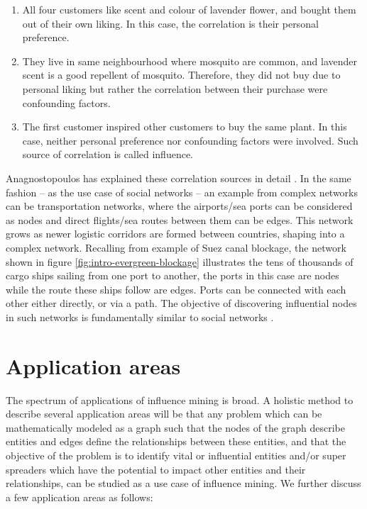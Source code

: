 	\begin{enumerate}
		\item All four customers like scent and colour of lavender flower, and bought them out of their own liking. In this case, the correlation is their personal preference.
		
		\item They live in same neighbourhood where mosquito are common, and lavender scent is a good repellent of mosquito. Therefore, they did not buy due to personal liking but rather the correlation between their purchase were confounding factors.
		
		\item The first customer inspired other customers to buy the same plant. In this case, neither personal preference nor confounding factors were involved. Such source of correlation is called influence.
	\end{enumerate}
	
	Anagnostopoulos has explained these correlation sources in detail \cite{anagnostopoulos2008}. In the same fashion -- as the use case of social networks -- an example from complex networks can be transportation networks, where the airports/sea ports can be considered as nodes and direct flights/sea routes between them can be edges. This network grows as newer logistic corridors are formed between countries, shaping into a complex network. Recalling from example of Suez canal blockage, the network shown in figure \ref{fig:intro-evergreen-blockage} illustrates the tens of thousands of cargo ships sailing from one port to another, the ports in this case are nodes while the route these ships follow are edges. Ports can be connected with each other either directly, or via a path. The objective of discovering influential nodes in such networks is fundamentally similar to social networks \cite{rocha2017}. \\
	
	\section{Application areas}
	\label{sec:intro-applications}
	The spectrum of applications of influence mining is broad. A holistic method to describe several application areas will be that any problem which can be mathematically modeled as a graph such that the nodes of the graph describe entities and edges define the relationships between these entities, and that the objective of the problem is to identify vital or influential entities and/or super spreaders which have the potential to impact other entities and their relationships, can be studied as a use case of influence mining. We further discuss a few application areas as follows:
	
